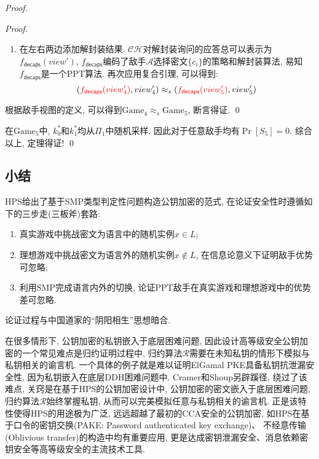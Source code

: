 \begin{proof}
\begin{proof}
\begin{enumerate}
\item 在左右两边添加解封装结果.  
    $\mathcal{CH}$对解封装询问的应答总可以表示为$f_\mathsf{decaps}(view')$, 
    $f_\mathsf{decaps}$编码了敌手$\mathcal{A}$选择密文$\{c_i\}$的策略和解封装算法, 易知$f_\mathsf{decaps}$是一个PPT算法. 
    再次应用复合引理, 可以得到:
    \begin{equation*}
        ({\color{red} f_\mathsf{decaps}(view_4')}, view_4') \approx_s ({\color{red} f_\mathsf{decaps}(view_5')}, view_5')
    \end{equation*}
\end{enumerate}
根据敌手视图的定义, 可以得到$\text{Game}_4 \approx_s \text{Game}_5$, 断言得证. \qed 
\end{proof}

在$\text{Game}_5$中, $k_0^*$和$k_1^*$均从$\Pi_1$中随机采样. 因此对于任意敌手均有$\Pr[S_5] = 0$. 
综合以上, 定理得证! \qed
\end{proof} 

\subsection*{小结}
HPS给出了基于SMP类型判定性问题构造公钥加密的范式, 在论证安全性时遵循如下的三步走(三板斧)套路: 
\begin{center}
\end{center}

\begin{enumerate}
    \item 真实游戏中挑战密文为语言中的随机实例$x \in L$; 
    \item 理想游戏中挑战密文为语言外的随机实例$x \notin L$, 在信息论意义下证明敌手优势可忽略; 
    \item 利用SMP完成语言内外的切换, 论证PPT敌手在真实游戏和理想游戏中的优势差可忽略. 
\end{enumerate}
论证过程与中国道家的``阴阳相生''思想暗合. 

在很多情形下, 公钥加密的私钥嵌入于底层困难问题, 
因此设计高等级安全公钥加密的一个常见难点是归约证明过程中, 归约算法$\mathcal{R}$需要在未知私钥的情形下模拟与私钥相关的谕言机. 
一个具体的例子就是难以证明ElGamal PKE具备私钥抗泄漏安全性, 因为私钥嵌入在底层DDH困难问题中.  
Cramer和Shoup另辟蹊径, 绕过了该难点, 关窍是在基于HPS的公钥加密设计中, 公钥加密的密文嵌入于底层困难问题, 
归约算法$\mathcal{R}$始终掌握私钥, 从而可以完美模拟任意与私钥相关的谕言机. 
正是该特性使得HPS的用途极为广泛, 远远超越了最初的CCA安全的公钥加密, 
如HPS在基于口令的密钥交换(PAKE: Password authenticated key exchange)、
不经意传输(Oblivious transfer)的构造中均有重要应用, 更是达成密钥泄漏安全、消息依赖密钥安全等高等级安全的主流技术工具. 


